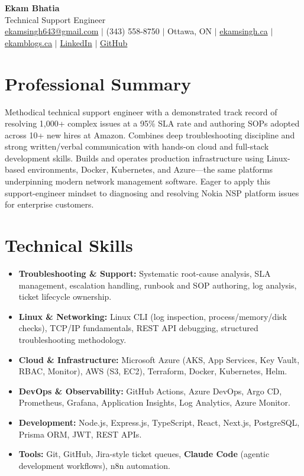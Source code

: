 \documentclass[11pt,a4paper]{article}
\begin{document}
\begin{center}
    {\LARGE \textbf{Ekam Bhatia}} \\
    \vspace{2pt}
    {\normalsize Technical Support Engineer} \\
    \vspace{4pt}
    \small
    \href{mailto:ekamsingh643@gmail.com}{ekamsingh643@gmail.com} $|$
    (343) 558-8750 $|$ Ottawa, ON $|$
    \href{https://www.ekamsingh.ca}{ekamsingh.ca} $|$
    \href{https://www.ekamblogs.ca}{ekamblogs.ca} $|$
    \href{https://www.linkedin.com/in/ekam-bhatia-335840168}{LinkedIn} $|$
    \href{https://github.com/bhat0155}{GitHub}
\end{center}

\section{Professional Summary}
Methodical technical support engineer with a demonstrated track record of resolving 1,000+ complex issues at a 95\% SLA rate and authoring SOPs adopted across 10+ new hires at Amazon. Combines deep troubleshooting discipline and strong written/verbal communication with hands-on cloud and full-stack development skills. Builds and operates production infrastructure using Linux-based environments, Docker, Kubernetes, and Azure---the same platforms underpinning modern network management software. Eager to apply this support-engineer mindset to diagnosing and resolving Nokia NSP platform issues for enterprise customers.

\section{Technical Skills}
\begin{itemize}
    \item \textbf{Troubleshooting \& Support:} Systematic root-cause analysis, SLA management, escalation handling, runbook and SOP authoring, log analysis, ticket lifecycle ownership.
    \item \textbf{Linux \& Networking:} Linux CLI (log inspection, process/memory/disk checks), TCP/IP fundamentals, REST API debugging, structured troubleshooting methodology.
    \item \textbf{Cloud \& Infrastructure:} Microsoft Azure (AKS, App Services, Key Vault, RBAC, Monitor), AWS (S3, EC2), Terraform, Docker, Kubernetes, Helm.
    \item \textbf{DevOps \& Observability:} GitHub Actions, Azure DevOps, Argo CD, Prometheus, Grafana, Application Insights, Log Analytics, Azure Monitor.
    \item \textbf{Development:} Node.js, Express.js, TypeScript, React, Next.js, PostgreSQL, Prisma ORM, JWT, REST APIs.
    \item \textbf{Tools:} Git, GitHub, Jira-style ticket queues, \textbf{Claude Code} (agentic development workflows), n8n automation.
\end{itemize}
\end{document}
